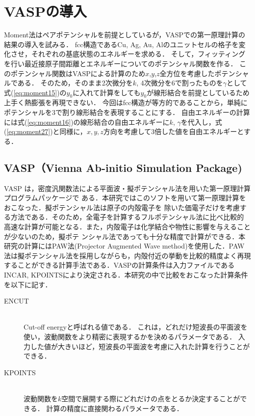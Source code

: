 \section{VASPの導入}
Moment法はペアポテンシャルを前提としているが，VASPでの第一原理計算の結果の導入を試みる．
fcc構造であるCu, Ag, Au, Alのユニットセルの格子を変化させ，それぞれの基底状態のエネルギーを求める．
そして，フィッティングを行い最近接原子間距離とエネルギーについてのポテンシャル関数を作る．
このポテンシャル関数はVASPによる計算のため$x$,$y$,$z$全方位を考慮したポテンシャルである．
そのため，そのまま2次微分を$k$, 4次微分を6で割ったものを$\gamma$として式(\ref{eq:moment15})の$y_0$に入れて計算をしても$y_0$が線形結合を前提としているため上手く熱膨張を再現できない．
今回はfcc構造が等方的であることから，単純にポテンシャルを3で割り線形結合を表現することにする．
自由エネルギーの計算には式(\ref{eq:moment16})の線形結合の自由エネルギーに$k$, $\gamma$を代入し，式(\ref{eq:moment27})と同様に，$x, y, z$方向を考慮して3倍した値を自由エネルギーとする．
\subsection{VASP（Vienna Ab-initio Simulation Package)}
VASP は，密度汎関数法による平面波・擬ポテンシャル法を用いた第一原理計算プログラムパッケージで
ある．本研究ではこのソフトを用いて第一原理計算をおこなった．擬ポテンシャル法は原子の内殻電子を
除いた価電子だけを考慮する方法である．そのため，全電子を計算するフルポテンシャル法に比べ比較的
高速な計算が可能となる．また，内殻電子は化学結合や物性に影響を与えることが少ないのため，擬ポテ
ンシャル法であっても十分な精度で計算ができる．本研究の計算にはPAW法(Projector Augmented Wave method)を使用した．PAW法は擬ポテンシャル法を採用しながらも，内殻付近の挙動を比較的精度よく再現することができる計算手法である．VASPの計算条件は入力ファイルであるINCAR, KPOINTSにより決定される．本研究の中で比較をおこなった計算条件を以下に記す．
\begin{description}
 \item[ENCUT]\mbox{}\\ 
	    Cut-off energyと呼ばれる値である．
	    これは，どれだけ短波長の平面波を使い，波動関数をより精密に表現するかを決めるパラメータである．
	    入力した値が大きいほど，短波長の平面波を考慮に入れた計算を行うことができる．
 \item[KPOINTS]\mbox{}\\
	    波動関数を$k$空間で展開する際にどれだけの点をとるか決定することができる．
	    計算の精度に直接関わるパラメータである．
\end{description}



